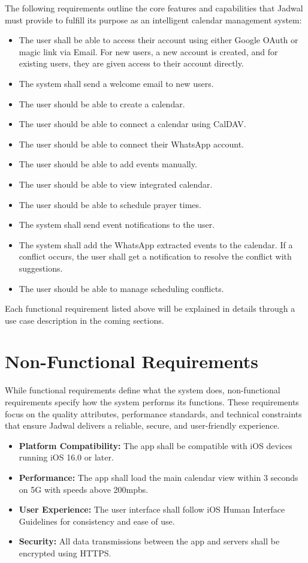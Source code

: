 The following requirements outline the core features and capabilities that Jadwal must provide to fulfill its purpose as an intelligent calendar management system:
\begin{itemize}
    \item The user shall be able to access their account using either Google OAuth or magic link via Email. For new users, a new account is created, and for existing users, they are given access to their account directly.
    \item The system shall send a welcome email to new users.
    \item The user should be able to create a calendar.
    \item The user should be able to connect a calendar using CalDAV.
    \item The user should be able to connect their WhatsApp account.
    \item The user should be able to add events manually.
    \item The user should be able to view integrated calendar.
    \item The user should be able to schedule prayer times.
    \item The system shall send event notifications to the user.
    \item The system shall add the WhatsApp extracted events to the calendar. If a conflict occurs, the user shall get a notification to resolve the conflict with suggestions.
    \item The user should be able to manage scheduling conflicts.
\end{itemize}

Each functional requirement listed above will be explained in details through a use case description in the coming sections.

\newpage

\section{Non-Functional Requirements}

While functional requirements define what the system does, non-functional requirements specify how the system performs its functions. These requirements focus on the quality attributes, performance standards, and technical constraints that ensure Jadwal delivers a reliable, secure, and user-friendly experience.

\begin{itemize}
    \item \textbf{Platform Compatibility:} The app shall be compatible with iOS devices running iOS 16.0 or later.
    \item \textbf{Performance:} The app shall load the main calendar view within 3 seconds on 5G with speeds above 200mpbs.
    \item \textbf{User Experience:} The user interface shall follow iOS Human Interface Guidelines for consistency and ease of use.
    \item \textbf{Security:} All data transmissions between the app and servers shall be encrypted using HTTPS.
\end{itemize}


